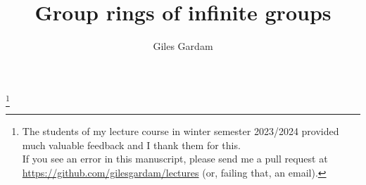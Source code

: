 \documentclass[oneside]{amsbook}
\theoremstyle{definition}
\theoremstyle{remark}
\numberwithin{section}{chapter}
\numberwithin{equation}{chapter}
\begin{document}
\frontmatter

\title{Group rings of infinite groups}
\author{Giles Gardam}
\address{University of Bonn}
\thanks{The students of my lecture course in winter semester 2023/2024 provided much valuable feedback and I thank them for this. \\ If you see an error in this manuscript, please send me a pull request at \url{https://github.com/gilesgardam/lectures} (or, failing that, an email).}

\maketitle
\tableofcontents


\mainmatter



\appendix




\backmatter




\printindex
\end{document}
